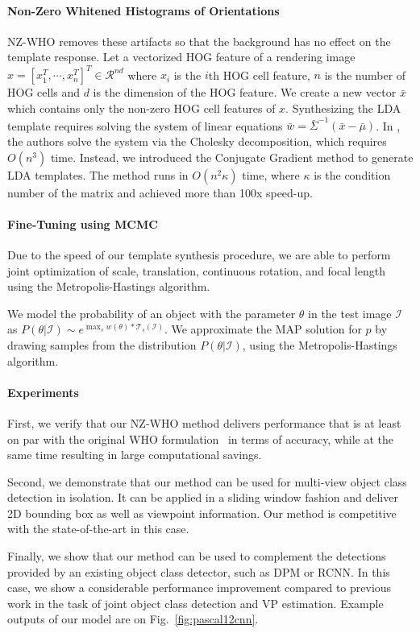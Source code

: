 \documentclass[extendedabs]{bmvc2k}
\begin{document}
\paragraph{Non-Zero Whitened Histograms of Orientations}

NZ-WHO removes these artifacts so that the background has no effect on the
template response. Let a vectorized HOG feature of a rendering image $x = [
x_1^T ,  \cdots , x_n^T ]^T \in \mathcal{R}^{nd}$ where $x_i$ is the $i$th HOG cell feature, $n$ is the
number of HOG cells and $d$ is the dimension of the HOG feature. We create a new
vector $\bar{x}$ which contains only the non-zero HOG cell features of $x$.
Synthesizing the LDA template requires solving the system of linear equations
$\bar{w}=\bar{\Sigma}^{-1}(\bar{x} - \bar{\mu})$. In \cite{Hariharan12}, the
authors solve the system via the Cholesky decomposition, which requires
$O(n^3)$ time. Instead, we introduced the Conjugate Gradient method to generate
LDA templates. The method runs in $O(n^2\kappa)$ time, where $\kappa$ is the condition number of the matrix and achieved more than 100x speed-up.


\paragraph{Fine-Tuning using MCMC}
Due to the speed of our template synthesis procedure, we are able to perform
joint optimization of scale, translation, continuous rotation, and focal length
using the Metropolis-Hastings algorithm.

We model the probability of an object with the parameter $\theta$ in the test
image $\mathcal{I}$ as $P(\theta| \mathcal{I}) \sim e^{ \max_{s} w(\theta)
	\ast \mathcal{T}_s(\mathcal{I})}$. We approximate the MAP solution for $p$ by
drawing samples from the distribution $P(\theta | \mathcal{I})$, using the
Metropolis-Hastings algorithm.

\paragraph{Experiments}

First, we verify that our NZ-WHO method delivers performance that is
at least on par with the original WHO formulation~\cite{Hariharan12} in terms of
accuracy, while at the same time resulting in large computational
savings.

Second, we demonstrate that our method can be used for multi-view
object class detection in isolation. It can be applied in a sliding
window fashion and deliver 2D bounding box as well as viewpoint
information. Our method is competitive with the state-of-the-art in this
case.

Finally, we show that our method can be used to complement the
detections provided by an existing object class detector, such
as DPM or RCNN. In this case, we show a considerable performance improvement
compared to previous work in the task of joint object class detection and VP
estimation. Example outputs of our model are on Fig.~\ref{fig:pascal12cnn}.


\end{document}
